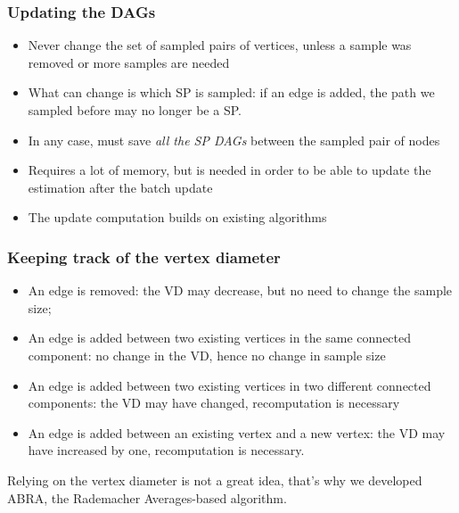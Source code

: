 \begin{frame}
  \frametitle{Updating the DAGs}
  \begin{itemize}
    \item Never change the set of sampled pairs of vertices, unless a sample was removed
      or more samples are needed
    \item What can change is which SP is sampled: if an edge is added, the path
      we sampled before may no longer be a SP.
      \pause
    \item In any case, must save \emph{all the SP DAGs} between the sampled
      pair of nodes
      \pause
    \item Requires a lot of memory, but is needed in order to be able to update
      the estimation after the batch update
    \item The update computation builds on existing algorithms
  \end{itemize}
\end{frame}

\begin{frame}
  \frametitle{Keeping track of the vertex diameter}
  \begin{itemize}
    \item An edge is removed: the VD may decrease, but no need to change the
      sample size;
    \pause
    \item An edge is added between two existing vertices in the same connected
      component: no change in the VD, hence no change in sample size
    \pause
    \item An edge is added between two existing vertices in two different
      connected components: the VD may have changed, recomputation is necessary
    \pause
    \item An edge is added between an existing vertex and a new vertex: the VD
      may have increased by one, recomputation is necessary.
  \end{itemize}
  \pause
  Relying on the vertex diameter is not a great idea, that's why we developed
  ABRA, the Rademacher Averages-based algorithm.
\end{frame}

